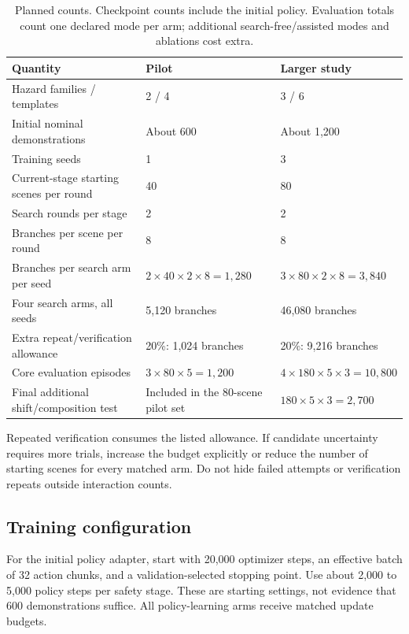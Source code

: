 \documentclass[11pt]{article}
\begin{document}
\begin{table}[htbp]
\centering\small
\begin{tabularx}{\textwidth}{@{}p{}Y Y@{}}
\toprule
Quantity & Pilot & Larger study \\
\midrule
Hazard families / templates & 2 / 4 & 3 / 6 \\
Initial nominal demonstrations & About 600 & About 1,200 \\
Training seeds & 1 & 3 \\
Current-stage starting scenes per round & 40 & 80 \\
Search rounds per stage & 2 & 2 \\
Branches per scene per round & 8 & 8 \\
Branches per search arm per seed & $2\times40\times2\times8=1{,}280$ & $3\times80\times2\times8=3{,}840$ \\
Four search arms, all seeds & 5,120 branches & 46,080 branches \\
Extra repeat/verification allowance & 20\%: 1,024 branches & 20\%: 9,216 branches \\
Core evaluation episodes & $3\times80\times5=1{,}200$ & $4\times180\times5\times3=10{,}800$ \\
Final additional shift/composition test & Included in the 80-scene pilot set & $180\times5\times3=2{,}700$ \\
\bottomrule
\end{tabularx}
\caption{Planned counts. Checkpoint counts include the initial policy. Evaluation totals count one declared mode per arm; additional search-free/assisted modes and ablations cost extra.}
\end{table}

Repeated verification consumes the listed allowance. If candidate uncertainty requires more trials, increase the budget explicitly or reduce the number of starting scenes for every matched arm. Do not hide failed attempts or verification repeats outside interaction counts.

\subsection{Training configuration}

For the initial policy adapter, start with 20,000 optimizer steps, an effective batch of 32 action chunks, and a validation-selected stopping point. Use about 2,000 to 5,000 policy steps per safety stage. These are starting settings, not evidence that 600 demonstrations suffice. All policy-learning arms receive matched update budgets.
\end{document}
